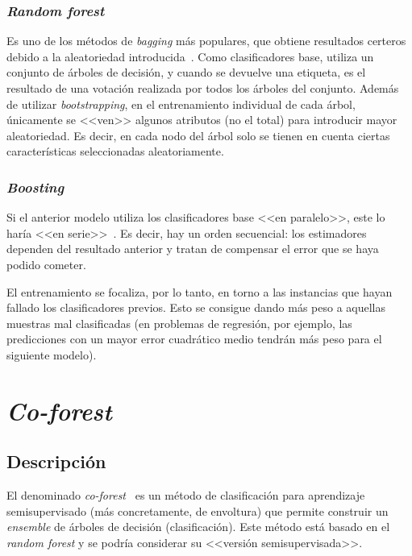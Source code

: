 \subsubsection{\textit{Random forest}}

Es uno de los métodos de \textit{bagging} más populares, que obtiene resultados certeros debido a la aleatoriedad introducida~\cite{originalCoForest2007}. Como clasificadores base, utiliza un conjunto de árboles de decisión, y cuando se devuelve una etiqueta, es el resultado de una votación realizada por todos los árboles del conjunto. Además de utilizar \textit{bootstrapping}, en el entrenamiento individual de cada árbol, únicamente se <<ven>> algunos atributos (no el total) para introducir mayor aleatoriedad. Es decir, en cada nodo del árbol solo se tienen en cuenta ciertas características seleccionadas aleatoriamente.
	
\subsubsection{\textit{Boosting}}

Si el anterior modelo utiliza los clasificadores base <<en paralelo>>, este lo haría <<en serie>>~\cite{engelen2018thesis}. Es decir, hay un orden secuencial: los estimadores dependen del resultado anterior y tratan de compensar el error que se haya podido cometer.

El entrenamiento se focaliza, por lo tanto, en torno a las instancias que hayan fallado los clasificadores previos. Esto se consigue dando más peso a aquellas muestras mal clasificadas (en problemas de regresión, por ejemplo, las predicciones con un mayor error cuadrático medio tendrán más peso para el siguiente modelo). 


\section{\textit{Co-forest}}

\subsection{Descripción}

El denominado \textit{co-forest}~\cite{originalCoForest2007} es un método de clasificación para aprendizaje semisupervisado (más concretamente, de envoltura) que permite construir un \textit{ensemble} de árboles de decisión (clasificación). Este método está basado en el \textit{random forest} y se podría considerar su <<versión semisupervisada>>. 

